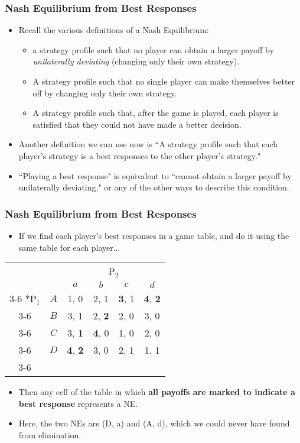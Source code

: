 \begin{frame}
\frametitle{Nash Equilibrium from Best Responses}
\begin{itemize}
	\item Recall the various definitions of a Nash Equilibrium:
	\begin{itemize}
		\item a strategy profile such that no player can obtain a larger payoff by \textit{unilaterally deviating} (changing only their own strategy).
		\item A strategy profile such that no single player can make themselves better off by changing only their own strategy.
		\item A strategy profile such that, after the game is played, each player is satisfied that they could not have made a better decision.
	\end{itemize}
	\item Another definition we can use now is ``A strategy profile such that each player's strategy is a best responses to the other player's strategy."
	\item ``Playing a best response" is equivalent to ``cannot obtain a larger payoff by unilaterally deviating," or any of the other ways to describe this condition.
\end{itemize}
\end{frame}

\begin{frame}
\frametitle{Nash Equilibrium from Best Responses}
\begin{itemize}
	\item If we find each player's best responses in a game table, and do it using the same table for each player...
\end{itemize}
\begin{table}[h]
\centering
\begin{tabular}{cc|c|c|c|c|}
	& \multicolumn{1}{c}{} & \multicolumn{4}{c}{P$_2$}\\
	& \multicolumn{1}{c}{} & \multicolumn{1}{c}{$a$} & \multicolumn{1}{c}{$b$} & \multicolumn{1}{c}{$c$} & \multicolumn{1}{c}{$d$} \\\cline{3-6}
	\multirow{4}*{P$_1$}  & $A$ & 1, 0 & 2, 1 & \textbf{3}, 1 & \colorbox{blue!25}{\textbf{4}, \textbf{2}} \\\cline{3-6}
	& $B$ & 3, 1 & 2, \textbf{2} & 2, 0 & 3, 0 \\\cline{3-6}
	& $C$ & 3, \textbf{1} & \textbf{4}, 0 & 1, 0 & 2, 0 \\\cline{3-6}
	& $D$ & \colorbox{blue!25}{\textbf{4}, \textbf{2}} & 3, 0 & 2, 1 & 1, 1 \\\cline{3-6}
\end{tabular}
\end{table}
\begin{itemize}
	\item Then any cell of the table in which \textbf{all payoffs are marked to indicate a best response} represents a NE.
	\item Here, the two NEs are (D, a) and (A, d), which we could never have found from elimination.
\end{itemize}
\end{frame}

